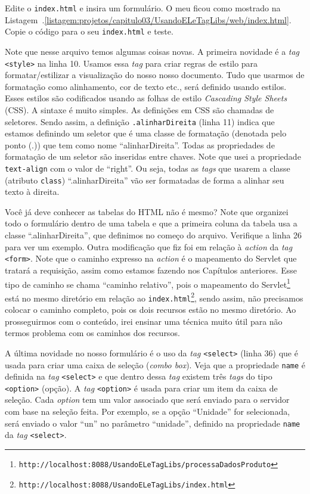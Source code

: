 Edite o \texttt{index.html} e insira um formulário. O meu ficou como mostrado na Listagem~\thechapter.\ref{listagem:projetos/capitulo03/UsandoELeTagLibs/web/index.html}. Copie o código para o seu \texttt{index.html} e teste. 


Note que nesse arquivo temos algumas coisas novas. A primeira novidade é a \textit{tag} \texttt{<style>} na linha 10. Usamos essa \textit{tag} para criar regras de estilo para formatar/estilizar a visualização do nosso nosso documento. Tudo que usarmos de formatação como alinhamento, cor de texto etc., será definido usando estilos. Esses estilos são codificados usando as folhas de estilo \textit{Cascading Style Sheets} (CSS). A sintaxe é muito simples. As definições em CSS são chamadas de seletores. Sendo assim, a definição \texttt{.alinharDireita} (linha 11) indica que estamos definindo um seletor que é uma classe de formatação (denotada pelo ponto (.)) que tem como nome ``alinharDireita''. Todas as propriedades de formatação de um seletor são inseridas entre chaves. Note que usei a propriedade \texttt{text-align} com o valor de ``right''. Ou seja, todas as \textit{tags} que usarem a classe (atributo \texttt{class}) ``.alinharDireita'' vão ser formatadas de forma a alinhar seu texto à direita.

Você já deve conhecer as tabelas do HTML não é mesmo? Note que organizei todo o formulário dentro de uma tabela e que a primeira coluna da tabela usa a classe ``.alinharDireita'', que definimos no começo do arquivo. Verifique a linha 26 para ver um exemplo. Outra modificação que fiz foi em relação à \textit{action} da \textit{tag} \texttt{<form>}. Note que o caminho expresso na \textit{action} é o mapeamento do Servlet que tratará a requisição, assim como estamos fazendo nos Capítulos anteriores. Esse tipo de caminho se chama ``caminho relativo'', pois o mapeamento do Servlet\footnote{\texttt{http://localhost:8088/UsandoELeTagLibs/processaDadosProduto}} está no mesmo diretório em relação ao \texttt{index.html}\footnote{\texttt{http://localhost:8088/UsandoELeTagLibs/index.html}}, sendo assim, não precisamos colocar o caminho completo, pois os dois recursos estão no mesmo diretório. Ao prosseguirmos com o conteúdo, irei ensinar uma técnica muito útil para não termos problema com os caminhos dos recursos.

A última novidade no nosso formulário é o uso da \textit{tag} \texttt{<select>} (linha 36) que é usada para criar uma caixa de seleção (\textit{combo box}). Veja que a propriedade \texttt{name} é definida na \textit{tag} \texttt{<select>} e que dentro dessa \textit{tag} existem três \textit{tags} do tipo \texttt{<option>} (opção). A \textit{tag} \texttt{<option>} é usada para criar um item da caixa de seleção. Cada \textit{option} tem um valor associado que será enviado para o servidor com base na seleção feita. Por exemplo, se a opção ``Unidade'' for selecionada, será enviado o valor ``un'' no parâmetro ``unidade'', definido na propriedade \texttt{name} da \textit{tag} \texttt{<select>}.

